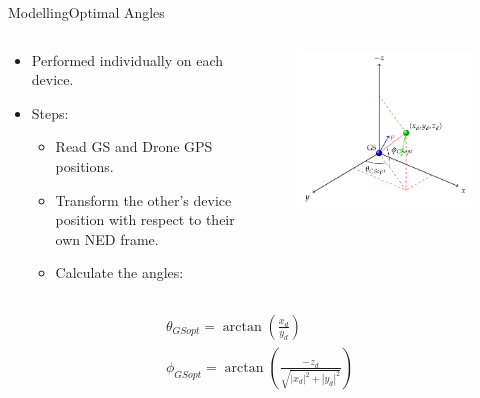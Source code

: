 \begin{frame}{Modelling}{Optimal Angles}
\begin{columns}[T]
    \begin{column}{.5\textwidth}
      \begin{block}{}
        \begin{itemize}
          \item {Performed individually on each device.}
          \item {Steps:}
          \begin{itemize}
          \item{Read GS and Drone GPS positions.}
          \item{Transform the other's device position with respect to their own NED frame.}
          \item{Calculate the angles:}
          \end{itemize}
        \end{itemize}
      \end{block}
    \end{column}

    \begin{column}{.5\textwidth}
    \begin{figure}[H]
    \includegraphics[scale=0.27]{figures/optimal.png}
    \end{figure}
    \end{column}
  \end{columns}
      \begin{align*}      
        \theta_{GSopt} = \arctan\left(\frac{x_{d}}{y_{d}}\right) \nonumber \\
        \phi_{GSopt}=  \arctan\left(\frac{-z_{d}}{\sqrt{|x_{d}|^{2}+|y_{d}|^{2}}}\right)
      \end{align*}
\end{frame}